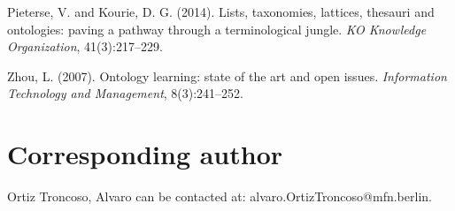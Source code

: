 \documentclass{ijcs_template}
\begin{document}
\begin{thebibliography}
Pieterse, V. and Kourie, D. G. (2014). Lists, taxonomies, lattices, thesauri and ontologies: paving a
pathway through a terminological jungle. {\it KO Knowledge Organization}, 41(3):217–229.

Zhou, L. (2007). Ontology learning: state of the art and open issues. {\it Information Technology and
Management}, 8(3):241–252.

\end{thebibliography}

\section*{Corresponding author}
Ortiz Troncoso, Alvaro can be contacted at: alvaro.OrtizTroncoso@mfn.berlin.
\end{document}
